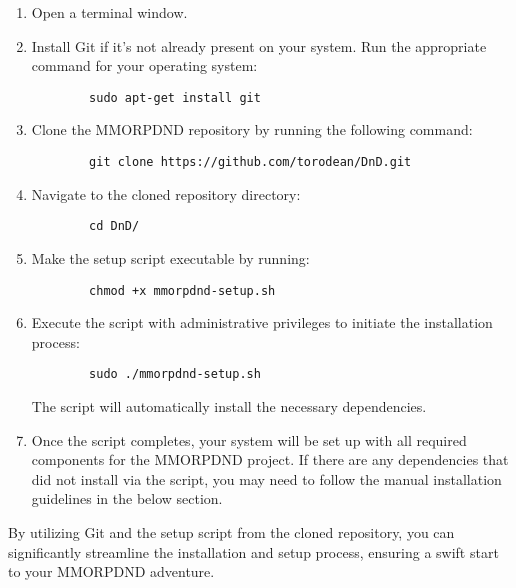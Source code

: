 \begin{enumerate}
	\item Open a terminal window.
	
	\item Install Git if it's not already present on your system. Run the appropriate command for your operating system:
	
	\begin{verbatim}
		sudo apt-get install git
	\end{verbatim}
	
	\item Clone the MMORPDND repository by running the following command:
	
	\begin{verbatim}
		git clone https://github.com/torodean/DnD.git
	\end{verbatim}
	
	\item Navigate to the cloned repository directory:
	
	\begin{verbatim}
		cd DnD/
	\end{verbatim}
	
	\item Make the setup script executable by running:
	
	\begin{verbatim}
		chmod +x mmorpdnd-setup.sh
	\end{verbatim}
	
	\item Execute the script with administrative privileges to initiate the installation process:
	
	\begin{verbatim}
		sudo ./mmorpdnd-setup.sh
	\end{verbatim}
	
	The script will automatically install the necessary dependencies.
	
	\item Once the script completes, your system will be set up with all required components for the MMORPDND project. If there are any dependencies that did not install via the script, you may need to follow the manual installation guidelines in the below section.
\end{enumerate}

By utilizing Git and the setup script from the cloned repository, you can significantly streamline the installation and setup process, ensuring a swift start to your MMORPDND adventure.


